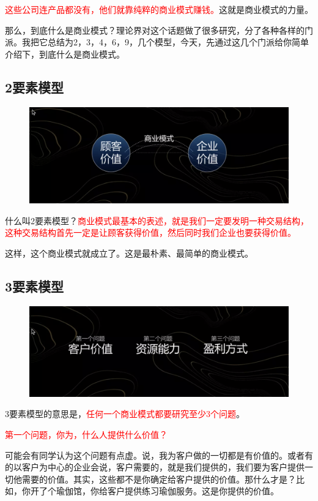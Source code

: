 \documentclass[12pt]{article}
\begin{document}
\textcolor{red}{这些公司连产品都没有，他们就靠纯粹的商业模式赚钱。}这就是商业模式的力量。

那么，到底什么是商业模式？理论界对这个话题做了很多研究，分了各种各样的门派。我把它总结为2，3，4，6，9，几个模型，今天，先通过这几个门派给你简单介绍下，到底什么是商业模式。

\subsection{2要素模型}
\begin{figure}[H]
    \centering
    \includegraphics[width=1\textwidth]{fig/BusinessModel_1.png}
\end{figure}
什么叫2要素模型？\textcolor{red}{商业模式最基本的表述，就是我们一定要发明一种交易结构，这种交易结构首先一定是让顾客获得价值，然后同时我们企业也要获得价值。}

这样，这个商业模式就成立了。这是最朴素、最简单的商业模式。

\subsection{3要素模型}
\begin{figure}[H]
    \centering
    \includegraphics[width=1\textwidth]{fig/BusinessModel_2.png}
\end{figure}
3要素模型的意思是，\textcolor{red}{任何一个商业模式都要研究至少3个问题}。

\textcolor{red}{第一个问题，你为，什么人提供什么价值？}

可能会有同学认为这个问题有点虚。说，我为客户做的一切都是有价值的。或者有的以客户为中心的企业会说，客户需要的，就是我们提供的，我们要为客户提供一切他需要的价值。其实，这些都不是你确定给客户提供的价值。那什么才是？比如，你开了个瑜伽馆，你给客户提供练习瑜伽服务。这是你提供的价值。
\end{document}
